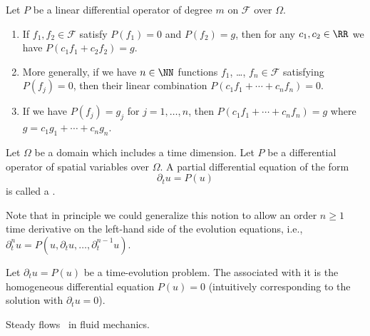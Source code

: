 \begin{node}
\begin{theorem}\label{pde-000J}%
Let $P$ be a linear differential operator of degree $m$ on $\mathcal{F}$
over $\Omega$.
\begin{enumerate}
\item If $f_{1},f_{2}\in\mathcal{F}$ satisfy $P(f_{1})=0$ and
$P(f_{2})=g$, then for any $c_{1},c_{2}\in\RR$ we have
$P(c_{1}f_{1}+c_{2}f_{2})=g$.
\item More generally, if we have $n\in\NN$
functions $f_{1}$, \dots, $f_{n}\in\mathcal{F}$ satisfying $P(f_{j})=0$,
then their linear combination $P(c_{1}f_{1}+\cdots+c_{n}f_{n})=0$.
\item If we have $P(f_{j})=g_{j}$ for $j=1,\dots,n$, then
$P(c_{1}f_{1}+\cdots+c_{n}f_{n})=g$ where $g=c_{1}g_{1}+\cdots+c_{n}g_{n}$.
\end{enumerate}
\end{theorem}
\end{node}

\begin{node}\label{pde-000M}%
\begin{definition}\label{pde-000N}%
Let $\Omega$ be a domain which includes a time dimension.
Let $P$ be a differential operator of spatial variables over $\Omega$.
A partial differential equation of the form
\begin{equation*}
\partial_{t}u=P(u)
\end{equation*}
is called a .

\begin{node}[Remark]\label{pde-000Q}%
Note that in principle we could generalize this notion to allow an order
$n\geq1$ time derivative on the left-hand side of the evolution
equations, i.e., $\partial_{t}^{n}u=P(u,\partial_{t}u,\dots,\partial_{t}^{n-1}u)$.
\end{node}
\end{definition}

\begin{definition}\label{pde-000O}%
Let $\partial_{t}u=P(u)$ be a time-evolution problem. The
 associated with it is the homogeneous
differential equation $P(u)=0$ (intuitively corresponding to the
solution with $\partial_{t}u=0$).

\begin{example}\label{pde-000P}%
Steady flows~ in fluid mechanics.
\end{example}
\end{definition}
\end{node}

